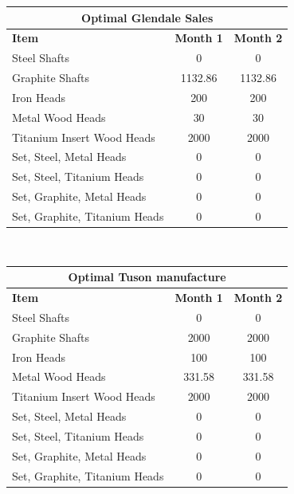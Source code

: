 \documentclass[12pt]{article}
\begin{document}
\noindent
\begin{center}
\begin{tabular}{ l c c }
\hline
\multicolumn{3}{c}{Optimal Glendale Sales} \\
\hline
\textbf{Item} & \textbf{Month 1} & \textbf{Month 2} \\
Steel Shafts & 0 & 0 \\
Graphite Shafts & 1132.86 & 1132.86 \\
Iron Heads & 200 & 200 \\
Metal Wood Heads & 30 & 30 \\
Titanium Insert Wood Heads & 2000 & 2000 \\
Set, Steel, Metal Heads & 0 & 0 \\
Set, Steel, Titanium Heads & 0 & 0 \\
Set, Graphite, Metal Heads & 0 & 0 \\
Set, Graphite, Titanium Heads & 0 & 0 \\
\hline
\end{tabular}
\vspace{5mm}
\\
\end{center}

\noindent
\begin{center}
\begin{tabular}{ l c c }
\hline
\multicolumn{3}{c}{Optimal Tuson manufacture} \\
\hline
\textbf{Item} & \textbf{Month 1} & \textbf{Month 2} \\
Steel Shafts & 0 & 0 \\
Graphite Shafts & 2000 & 2000 \\
Iron Heads & 100 & 100 \\
Metal Wood Heads & 331.58 & 331.58 \\
Titanium Insert Wood Heads & 2000 & 2000 \\
Set, Steel, Metal Heads & 0 & 0 \\
Set, Steel, Titanium Heads & 0 & 0 \\
Set, Graphite, Metal Heads & 0 & 0 \\
Set, Graphite, Titanium Heads & 0 & 0 \\
\hline
\end{tabular}
\vspace{5mm}
\\
\end{center}
\end{document}
